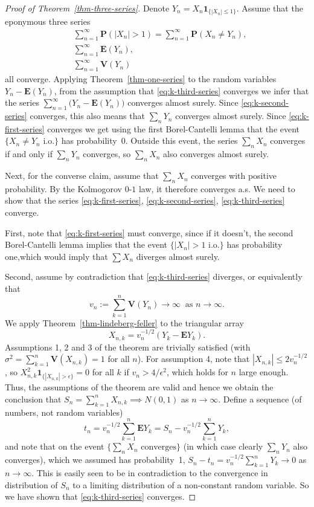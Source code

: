 \documentclass[12pt]{article}
\newcommand{\prob}{\mathbf{P}}
\newcommand{\expec}{\mathbf{E}}
\newcommand{\var}{\mathbf{V}}
\newcommand{\ind}{\textbf{1}}
\theoremstyle{example}
\begin{document}
\begin{proof}[Proof of Theorem~\ref{thm-three-series}]
Denote $Y_n = X_n \ind_{\{|X_n|\le 1\}}$. Assume that the eponymous three series
\begin{align}
\label{eq:k-first-series} &\sum_{n=1}^\infty \prob(|X_n|>1) = \sum_{n=1}^\infty \prob(X_n\neq Y_n), \\
\label{eq:k-second-series} &\sum_{n=1}^\infty \expec(Y_n), \\ 
\label{eq:k-third-series} &\sum_{n=1}^\infty \var(Y_n)
\end{align}
all converge. Applying Theorem~\ref{thm-one-series} to the random variables $Y_n-\expec(Y_n)$, from the assumption that \eqref{eq:k-third-series} converges we infer that the series $\sum_{n=1}^\infty \big( Y_n-\expec(Y_n) \big)$ converges almost surely. Since \eqref{eq:k-second-series} converges, this also means that $\sum_n Y_n$ converges almost surely. Since \eqref{eq:k-first-series} converges we get using the first Borel-Cantelli lemma that the event $\{ X_n \neq Y_n\textrm{ i.o.} \}$ has probability~$0$. Outside this event, the series $\sum_n X_n$ converges if and only if $\sum_n Y_n$ converges, so $\sum_n X_n$ also converges almost surely.

Next, for the converse claim, assume that $\sum_n X_n$ converges with positive probability. By the Kolmogorov $0$-$1$ law, it therefore converges a.s. We need to show that the series \eqref{eq:k-first-series}, \eqref{eq:k-second-series}, \eqref{eq:k-third-series} converge.

First, note that \eqref{eq:k-first-series} must converge, since if it doesn't, the second Borel-Cantelli lemma implies that the event $\{ |X_n|>1 \textrm{ i.o.} \}$ has probability one,which would imply that $\sum X_n$ diverges almost surely.

Second, assume by contradiction that \eqref{eq:k-third-series} diverges, or equivalently that $$v_n := \sum_{k=1}^n \var(Y_n) \to \infty\ \textrm{ as }n\to\infty.$$
We apply Theorem~\ref{thm-lindeberg-feller} to the triangular array
$$ X_{n,k} = v_n^{-1/2} \left(Y_k - \expec Y_k\right). $$
Assumptions 1, 2 and 3 of the theorem are trivially satisfied (with $\sigma^2 = \sum_{k=1}^n \var(X_{n,k}) = 1$ for all $n$). For assumption 4, note that $|X_{n,k}| \le 2 v_n^{-1/2}$, so
$X_{n,k}^2 \ind_{\{|X_{n,k}|>\epsilon\}} = 0$ for all $k$ if $v_n > 4/\epsilon^2$, which holds for $n$ large enough. Thus, the assumptions of the theorem are valid and hence we obtain the conclusion that $S_n=\sum_{k=1}^n X_{n,k} \implies N(0,1)$ as $n\to\infty$.
Define a sequence (of numbers, not random variables)
$$
t_n = v_n^{-1/2} \sum_{k=1}^n \expec Y_k = S_n - v_n^{-1/2}\sum_{k=1}^n Y_k,
$$
and note that on the event $\{\sum_n X_n \textrm{ converges} \}$ (in which case clearly $\sum_n Y_n$ also converges), which we assumed has probability~1, $S_n-t_n = v_n^{-1/2} \sum_{k=1}^n Y_k \to 0$ as $n\to\infty$. This is easily seen to be in contradiction to the convergence in distribution of $S_n$ to a limiting distribution of a non-constant random variable. So we have shown that \eqref{eq:k-third-series} converges.


\end{proof}
\end{document}
